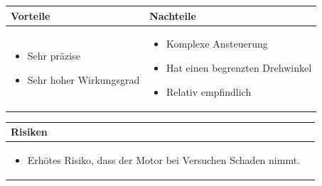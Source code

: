\begin{table}[h]
\begin{tabular}{p{} | p{}}


 \textbf{Vorteile} & \textbf{Nachteile} \\ \hline
	 
\begin{itemize}
\item Sehr präzise
\item Sehr hoher Wirkungsgrad
\end{itemize}

 
 &
 
\begin{itemize}
\item Komplexe Ansteuerung
\item Hat einen begrenzten Drehwinkel
\item Relativ empfindlich
\end{itemize}

\end{tabular}
\end{table}

\begin{table}[h]
\begin{tabular}{p{}p{}}


 \textbf{Risiken} & \\ \hline
	 
\begin{itemize}
\item Erhötes Risiko, dass der Motor bei Versuchen Schaden nimmt.
\end{itemize}

 
\end{tabular}
\end{table}

\pagebreak